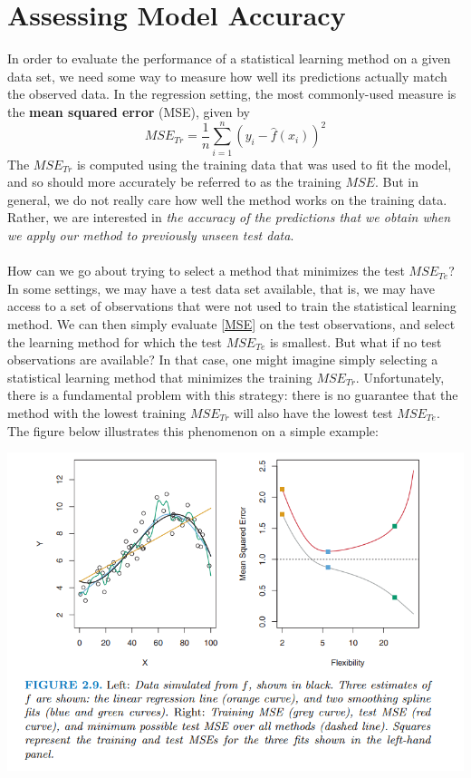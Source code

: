\section{Assessing Model Accuracy}
In order to evaluate the performance of a statistical learning method on a given data set, we need some way to measure how well its predictions actually match the observed data. In the regression setting, the most commonly-used measure is the \textbf{mean squared error} (MSE), given by
\begin{equation}
    MSE_{Tr} = \frac{1}{n} \sum_{i=1}^n (y_i - \hat{f}(x_i))^2
    \label{MSE}
\end{equation}
The $MSE_{Tr}$ is computed using the training data that was used to fit the model, and so should more accurately be referred to as the training $MSE$. But in general, we do not really care how well the method works on the training data. Rather, we are interested in \textit{the accuracy of the predictions that we obtain when we apply our method to previously unseen test data}.\\\\
How can we go about trying to select a method that minimizes the test
$MSE_{Te}$?  In some settings, we may have a test data set available, that is,
we may have access to a set of observations that were not used to train
the statistical learning method. We can then simply evaluate \ref{MSE} on the
test observations, and select the learning method for which the test $MSE_{Te}$ is smallest. But what if no test observations are available? In that case, one might imagine simply selecting a statistical learning method that minimizes the training $MSE_{Tr}$. Unfortunately, there is a fundamental problem with this strategy: there is no guarantee that the method with the lowest training $MSE_{Tr}$ will also have the lowest test $MSE_{Te}$. The figure below illustrates this phenomenon on a simple example:
\begin{center}
    \includegraphics[scale=0.8]{images/overfit_1.png}
\end{center}
